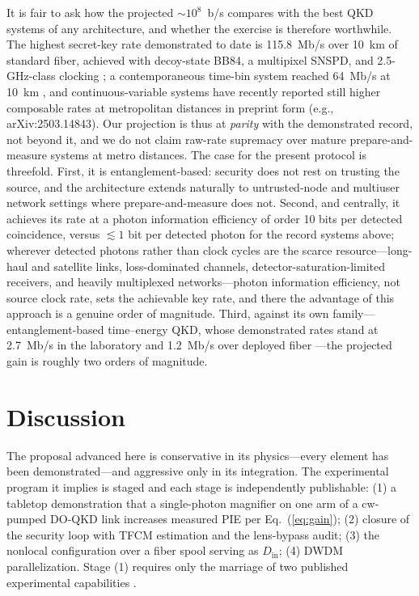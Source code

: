 \documentclass[11pt]{article}
\begin{document}
It is fair to ask how the projected $\sim 10^8$~b/s compares with the best QKD systems of any architecture, and whether the exercise is therefore worthwhile. The highest secret-key rate demonstrated to date is 115.8~Mb/s over 10~km of standard fiber, achieved with decoy-state BB84, a multipixel SNSPD, and 2.5-GHz-class clocking \cite{Li2023}; a contemporaneous time-bin system reached 64~Mb/s at 10~km \cite{Grunenfelder2023}, and continuous-variable systems have recently reported still higher composable rates at metropolitan distances in preprint form (e.g., arXiv:2503.14843). Our projection is thus at \emph{parity} with the demonstrated record, not beyond it, and we do not claim raw-rate supremacy over mature prepare-and-measure systems at metro distances. The case for the present protocol is threefold. First, it is entanglement-based: security does not rest on trusting the source, and the architecture extends naturally to untrusted-node and multiuser network settings where prepare-and-measure does not. Second, and centrally, it achieves its rate at a photon information efficiency of order 10 bits per detected coincidence, versus $\lesssim 1$ bit per detected photon for the record systems above; wherever detected photons rather than clock cycles are the scarce resource---long-haul and satellite links, loss-dominated channels, detector-saturation-limited receivers, and heavily multiplexed networks---photon information efficiency, not source clock rate, sets the achievable key rate, and there the advantage of this approach is a genuine order of magnitude. Third, against its own family---entanglement-based time--energy QKD, whose demonstrated rates stand at 2.7~Mb/s in the laboratory \cite{Zhong2015} and 1.2~Mb/s over deployed fiber \cite{Lee2016}---the projected gain is roughly two orders of magnitude.

\section{Discussion}
\label{sec:discussion}

The proposal advanced here is conservative in its physics---every element has been demonstrated---and aggressive only in its integration. The experimental program it implies is staged and each stage is independently publishable: (1) a tabletop demonstration that a single-photon magnifier on one arm of a cw-pumped DO-QKD link increases measured PIE per Eq.~(\ref{eq:gain}); (2) closure of the security loop with TFCM estimation and the lens-bypass audit; (3) the nonlocal configuration over a fiber spool serving as $D_{\mathrm{in}}$; (4) DWDM parallelization. Stage (1) requires only the marriage of two published experimental capabilities \cite{Lee2014,Joshi2022}.
\end{document}
